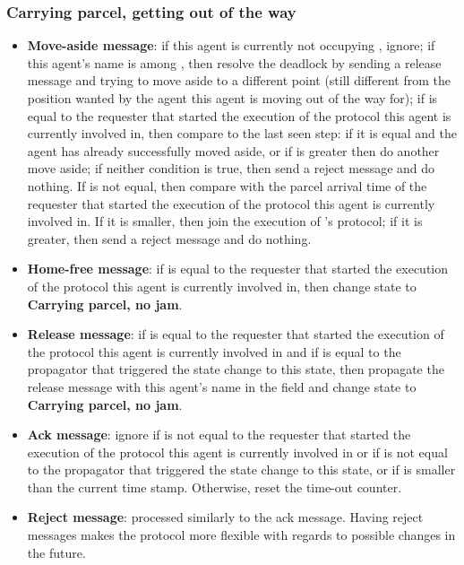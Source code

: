 \subsubsection*{Carrying parcel, getting out of the way}
\begin{itemize}
    \item \textbf{Move-aside message}: if this agent is currently not occupying , ignore; if this agent's name is among , then resolve the deadlock by sending a release message and trying to move aside to a different point (still different from the position wanted by the agent this agent is moving out of the way for); if  is equal to the requester that started the execution of the protocol this agent is currently involved in, then compare  to the last seen step: if it is equal and the agent has already successfully moved aside, or if  is greater then do another move aside; if neither condition is true, then send a reject message and do nothing. If  is not equal, then compare  with the parcel arrival time of the requester that started the execution of the protocol this agent is currently involved in. If it is smaller, then join the execution of 's protocol; if it is greater, then send a reject message and do nothing.
    \item \textbf{Home-free message}: if  is equal to the requester that started the execution of the protocol this agent is currently involved in, then change state to \textbf{Carrying parcel, no jam}.
    \item \textbf{Release message}: if  is equal to the requester that started the execution of the protocol this agent is currently involved in and if  is equal to the propagator that triggered the state change to this state, then propagate the release message with this agent's name in the  field and change state to \textbf{Carrying parcel, no jam}.
    \item \textbf{Ack message}: ignore if  is not equal to the requester that started the execution of the protocol this agent is currently involved in or if  is not equal to the propagator that triggered the state change to this state, or if  is smaller than the current time stamp. Otherwise, reset the time-out counter.
    \item \textbf{Reject message}: processed similarly to the ack message. Having reject messages makes the protocol more flexible with regards to possible changes in the future.

\end{itemize}
